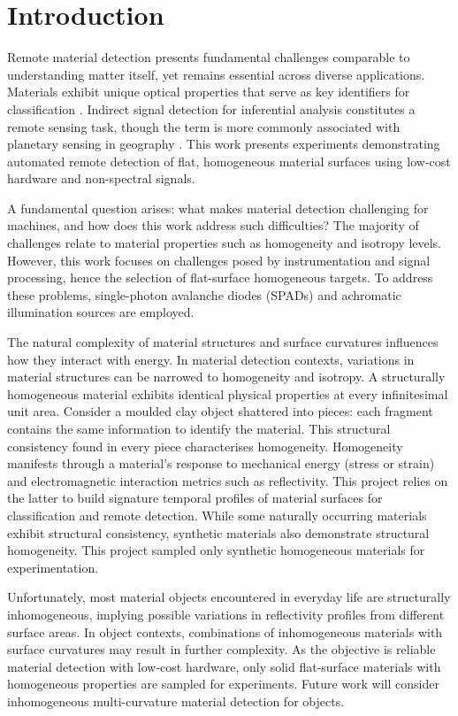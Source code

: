 \documentclass[12pt,a4paper,oneside]{report}
\let\oldsection\section
\renewcommand{\section}{\clearpage\oldsection}
\begin{document}
\section{Introduction}
\label{sec:flat_material_introduction}
\noindent Remote material detection presents fundamental challenges comparable to understanding matter itself, yet remains essential across diverse applications. Materials exhibit unique optical properties that serve as key identifiers for classification \cite{cleveland2009}. Indirect signal detection for inferential analysis constitutes a remote sensing task, though the term is more commonly associated with planetary sensing in geography \cite{cleveland2009}. This work presents experiments demonstrating automated remote detection of flat, homogeneous material surfaces using low-cost hardware and non-spectral signals.

A fundamental question arises: what makes material detection challenging for machines, and how does this work address such difficulties? The majority of challenges relate to material properties such as homogeneity and isotropy levels. However, this work focuses on challenges posed by instrumentation and signal processing, hence the selection of flat-surface homogeneous targets. To address these problems, single-photon avalanche diodes (SPADs) and achromatic illumination sources are employed.

The natural complexity of material structures and surface curvatures influences how they interact with energy. In material detection contexts, variations in material structures can be narrowed to homogeneity and isotropy. A structurally homogeneous material exhibits identical physical properties at every infinitesimal unit area. Consider a moulded clay object shattered into pieces: each fragment contains the same information to identify the material. This structural consistency found in every piece characterises homogeneity. Homogeneity manifests through a material's response to mechanical energy (stress or strain) and electromagnetic interaction metrics such as reflectivity. This project relies on the latter to build signature temporal profiles of material surfaces for classification and remote detection. While some naturally occurring materials exhibit structural consistency, synthetic materials also demonstrate structural homogeneity. This project sampled only synthetic homogeneous materials for experimentation.

Unfortunately, most material objects encountered in everyday life are structurally inhomogeneous, implying possible variations in reflectivity profiles from different surface areas. In object contexts, combinations of inhomogeneous materials with surface curvatures may result in further complexity. As the objective is reliable material detection with low-cost hardware, only solid flat-surface materials with homogeneous properties are sampled for experiments. Future work will consider inhomogeneous multi-curvature material detection for objects.
\end{document}
